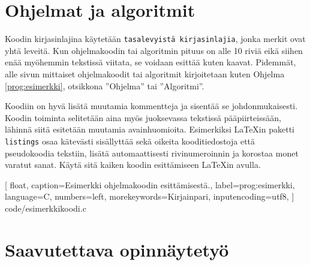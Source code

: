 
\section{Ohjelmat ja algoritmit}

Koodin kirjasinlajina käytetään \texttt{tasalevyistä kirjasinlajia}, jonka merkit ovat yhtä leveitä. Kun ohjelmakoodin tai algoritmin pituus on alle 10 riviä eikä siihen enää myöhemmin tekstissä viitata, se voidaan esittää kuten kaavat. Pidemmät, alle sivun mittaiset ohjelmakoodit tai algoritmit kirjoitetaan kuten Ohjelma \ref{prog:esimerkki}, otsikkona ''Ohjelma'' tai ''Algoritmi''.

Koodiin on hyvä lisätä muutamia kommentteja ja sisentää se johdonmukaisesti. Koodin toiminta selitetään aina myös juoksevassa tekstissä pääpiirteissään, lähinnä siitä esitetään muutamia avainhuomioita. Esimerkiksi \LaTeX{}in paketti \texttt{listings} \parencite{listings,notsoshort} osaa kätevästi sisällyttää sekä oikeita kooditiedostoja että pseudokoodia tekstiin, lisätä automaattisesti rivinumeroinnin ja korostaa monet varatut sanat. Käytä sitä kaiken koodin esittämiseen \LaTeX{}in avulla.

\renewcommand{\lstlistingname}{Ohjelma}

    [
        float,
        caption={Esimerkki ohjelmakoodin esittämisestä.},
        label=prog:esimerkki,
        language=C,
        numbers=left,
        morekeywords={Kirjainpari},
        inputencoding=utf8,
    ]
    {code/esimerkkikoodi.c}

\section{Saavutettava opinnäytetyö}

